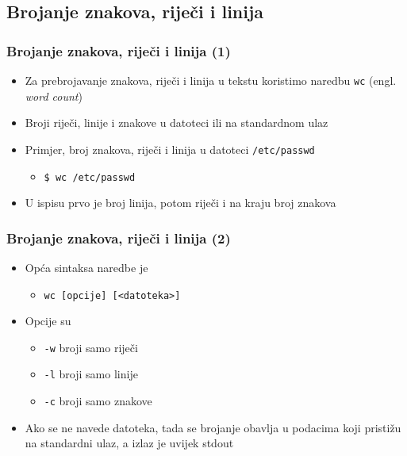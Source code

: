 \documentclass{beamer}
\newcommand{\shell}[1]{\texttt{#1}}
\begin{document}
\subsection{Brojanje znakova, riječi i linija}
\begin{frame}[t]
\frametitle{Brojanje znakova, riječi i linija (1)}
\begin{itemize}
  \item Za prebrojavanje znakova, riječi i linija u tekstu koristimo 
        naredbu \shell{wc} (engl. \emph{word count})
  \item Broji riječi, linije i znakove u datoteci ili na standardnom ulaz 
  \item Primjer, broj znakova, riječi i linija u datoteci 
        \shell{/etc/passwd}
  \begin{itemize}
    \item[] \shell{\$ wc /etc/passwd}
  \end{itemize}
  \item U ispisu prvo je broj linija, potom riječi i na kraju broj znakova
\end{itemize}
\end{frame}

\begin{frame}[t]
\frametitle{Brojanje znakova, riječi i linija (2)}
\begin{itemize}
  \item Opća sintaksa naredbe je
  \begin{itemize}
    \item[] \shell{wc [opcije] [<datoteka>]}
  \end{itemize}
  \item Opcije su
  \begin{itemize}
    \item[] \shell{-w} broji samo riječi
    \item[] \shell{-l} broji samo linije
    \item[] \shell{-c} broji samo znakove
  \end{itemize}
  \item Ako se ne navede datoteka, tada se brojanje obavlja u podacima koji
        pristižu na standardni ulaz, a izlaz je uvijek stdout
\end{itemize}
\end{frame}
\end{document}
